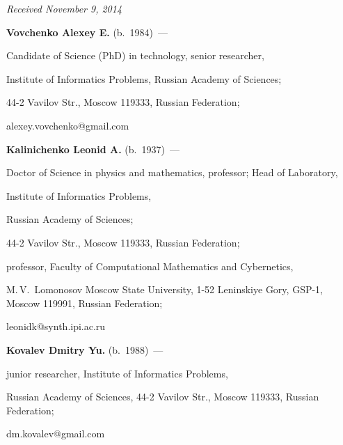 


\vspace*{-6pt}



\hfill{\small\textit{Received November 9, 2014}}



\vspace*{-18pt}



\Contr



\noindent

\textbf{Vovchenko Alexey E.} (b.\ 1984)~---

Candidate of Science (PhD) in technology, senior researcher,

Institute of Informatics Problems, Russian Academy of Sciences;

44-2 Vavilov Str., Moscow 119333, Russian Federation;

alexey.vovchenko@gmail.com



\vspace*{3pt}



\noindent

\textbf{Kalinichenko Leonid A.} (b.\ 1937)~---

Doctor of Science in physics and mathematics, professor; Head of Laboratory,

Institute of Informatics Problems,

Russian Academy of Sciences;

44-2 Vavilov Str., Moscow 119333, Russian Federation;

professor, Faculty of Computational Mathematics and Cybernetics,

M.\,V.~Lomonosov Moscow State University, 1-52  Leninskiye Gory, GSP-1, Moscow 119991, Russian Federation;

 leonidk@synth.ipi.ac.ru



\vspace*{3pt}



\noindent

\textbf{Kovalev Dmitry  Yu.} (b.\ 1988)~---

junior researcher, Institute of Informatics Problems,

Russian Academy of Sciences, 44-2 Vavilov Str., Moscow 119333, Russian Federation;

 dm.kovalev@gmail.com









\label{end\stat}



\renewcommand{\bibname}{\protect\rm Литература}



